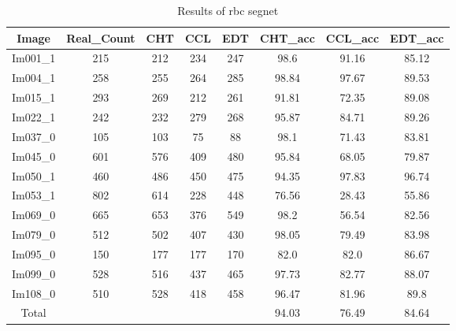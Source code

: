 \begin{table}[H]
\centering
\begin{tabular}{|c|c|c|c|c|c|c|c|}
\hline
 \textbf{Image} & \textbf{Real\_Count} & \textbf{CHT} & \textbf{CCL} & \textbf{EDT} & \textbf{CHT\_acc} & \textbf{CCL\_acc} & \textbf{EDT\_acc} \\ \hline
 Im001\_1 & 215 & 212 & 234 & 247 & 98.6 & 91.16 & 85.12 \\ 
 Im004\_1 & 258 & 255 & 264 & 285 & 98.84 & 97.67 & 89.53 \\ 
 Im015\_1 & 293 & 269 & 212 & 261 & 91.81 & 72.35 & 89.08 \\ 
 Im022\_1 & 242 & 232 & 279 & 268 & 95.87 & 84.71 & 89.26 \\ 
 Im037\_0 & 105 & 103 & 75 & 88 & 98.1 & 71.43 & 83.81 \\ 
 Im045\_0 & 601 & 576 & 409 & 480 & 95.84 & 68.05 & 79.87 \\ 
 Im050\_1 & 460 & 486 & 450 & 475 & 94.35 & 97.83 & 96.74 \\ 
 Im053\_1 & 802 & 614 & 228 & 448 & 76.56 & 28.43 & 55.86 \\ 
 Im069\_0 & 665 & 653 & 376 & 549 & 98.2 & 56.54 & 82.56 \\ 
 Im079\_0 & 512 & 502 & 407 & 430 & 98.05 & 79.49 & 83.98 \\ 
 Im095\_0 & 150 & 177 & 177 & 170 & 82.0 & 82.0 & 86.67 \\ 
 Im099\_0 & 528 & 516 & 437 & 465 & 97.73 & 82.77 & 88.07 \\ 
 Im108\_0 & 510 & 528 & 418 & 458 & 96.47 & 81.96 & 89.8 \\ \hline
 Total &  &  &  &  & 94.03 & 76.49 & 84.64 \\ 

\hline
\end{tabular}
\caption{Results of rbc segnet}
\label{Results of rbc segnet}
\end{table}
